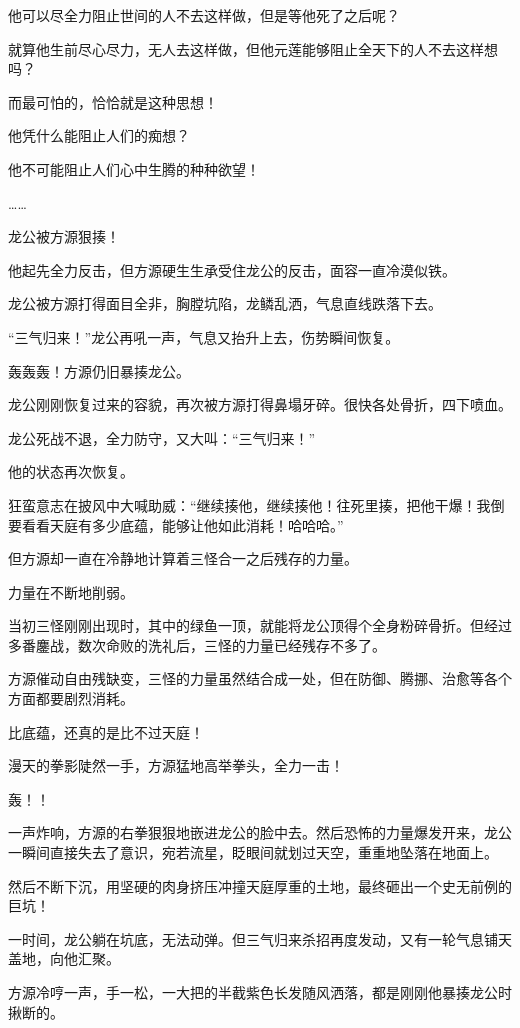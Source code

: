 \begin{this_body}
他可以尽全力阻止世间的人不去这样做，但是等他死了之后呢？

就算他生前尽心尽力，无人去这样做，但他元莲能够阻止全天下的人不去这样想吗？

而最可怕的，恰恰就是这种思想！

他凭什么能阻止人们的痴想？

他不可能阻止人们心中生腾的种种欲望！

……

龙公被方源狠揍！

他起先全力反击，但方源硬生生承受住龙公的反击，面容一直冷漠似铁。

龙公被方源打得面目全非，胸膛坑陷，龙鳞乱洒，气息直线跌落下去。

“三气归来！”龙公再吼一声，气息又抬升上去，伤势瞬间恢复。

轰轰轰！方源仍旧暴揍龙公。

龙公刚刚恢复过来的容貌，再次被方源打得鼻塌牙碎。很快各处骨折，四下喷血。

龙公死战不退，全力防守，又大叫：“三气归来！”

他的状态再次恢复。

狂蛮意志在披风中大喊助威：“继续揍他，继续揍他！往死里揍，把他干爆！我倒要看看天庭有多少底蕴，能够让他如此消耗！哈哈哈。”

但方源却一直在冷静地计算着三怪合一之后残存的力量。

力量在不断地削弱。

当初三怪刚刚出现时，其中的绿鱼一顶，就能将龙公顶得个全身粉碎骨折。但经过多番鏖战，数次命败的洗礼后，三怪的力量已经残存不多了。

方源催动自由残缺变，三怪的力量虽然结合成一处，但在防御、腾挪、治愈等各个方面都要剧烈消耗。

比底蕴，还真的是比不过天庭！

漫天的拳影陡然一手，方源猛地高举拳头，全力一击！

轰！！

一声炸响，方源的右拳狠狠地嵌进龙公的脸中去。然后恐怖的力量爆发开来，龙公一瞬间直接失去了意识，宛若流星，眨眼间就划过天空，重重地坠落在地面上。

然后不断下沉，用坚硬的肉身挤压冲撞天庭厚重的土地，最终砸出一个史无前例的巨坑！

一时间，龙公躺在坑底，无法动弹。但三气归来杀招再度发动，又有一轮气息铺天盖地，向他汇聚。

方源冷哼一声，手一松，一大把的半截紫色长发随风洒落，都是刚刚他暴揍龙公时揪断的。


\end{this_body}
